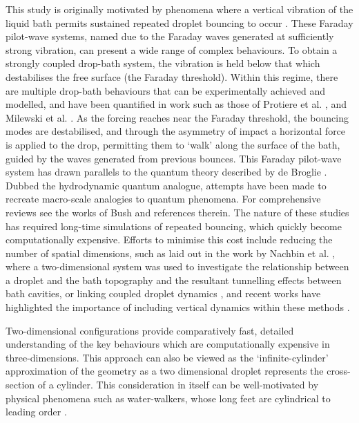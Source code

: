 This study is originally motivated by phenomena where a vertical vibration of the liquid bath permits sustained repeated droplet bouncing to occur \cite{couder2005walking}. These Faraday pilot-wave systems, named due to the Faraday waves generated at sufficiently strong vibration, can present a wide range of complex behaviours. To obtain a strongly coupled drop-bath system, the vibration is held below that which destabilises the free surface (the Faraday threshold). Within this regime, there are multiple drop-bath behaviours that can be experimentally achieved and modelled, and have been quantified in work such as those of Protiere et al. \cite{protiere2006particle}, and Milewski et al. \cite{milewski2015faraday}. As the forcing reaches near the Faraday threshold, the bouncing modes are destabilised, and through the asymmetry of impact a horizontal force is applied to the drop, permitting them to `walk' along the surface of the bath, guided by the waves generated from previous bounces. This Faraday pilot-wave system has drawn parallels to the quantum theory described by de Broglie \cite{de1926interference}. Dubbed the hydrodynamic quantum analogue, attempts have been made to recreate macro-scale analogies to quantum phenomena. For comprehensive reviews see the works of Bush \cite{bush2015pilot, bush2018introduction} and references therein.
The nature of these studies has required long-time simulations of repeated bouncing, which quickly become computationally expensive. Efforts to minimise this cost include reducing the number of spatial dimensions, such as laid out in the work by Nachbin et al. \cite{nachbin2017tunneling}, where a two-dimensional system was used to investigate the relationship between a droplet and the bath topography and the resultant tunnelling effects between bath cavities, or linking coupled droplet dynamics \cite{nachbin2018walking}, and recent works have highlighted the importance of including vertical dynamics within these methods \cite{papatryfonos2024static}. 

Two-dimensional configurations provide comparatively fast, detailed understanding of the key behaviours which are computationally expensive in three-dimensions. This approach can also be viewed as the  `infinite-cylinder' approximation of the geometry as a two dimensional droplet represents the cross-section of a cylinder. This consideration in itself can be well-motivated by physical phenomena such as water-walkers, whose long feet are cylindrical to leading order \cite{hu2003hydrodynamics}.


